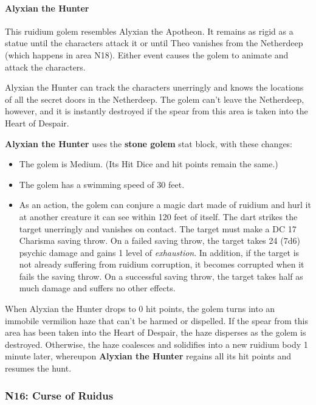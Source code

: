 \documentclass[a4paper, 11pt, bg=full, twocolumn, nooutline]{dndbook}
\begin{document}
\paragraph{Alyxian the Hunter}

This ruidium golem resembles Alyxian the Apotheon. It remains as rigid as a statue until the characters attack it or until Theo vanishes from the Netherdeep (which happens in area N18). Either event causes the golem to animate and attack the characters.

Alyxian the Hunter can track the characters unerringly and knows the locations of all the secret doors in the Netherdeep. The golem can't leave the Netherdeep, however, and it is instantly destroyed if the spear from this area is taken into the Heart of Despair.

\textbf{Alyxian the Hunter} uses the \textbf{stone golem} stat block, with these changes:

\begin{itemize}
\item The golem is Medium. (Its Hit Dice and hit points remain the same.)
\item The golem has a swimming speed of 30 feet.
\item As an action, the golem can conjure a magic dart made of ruidium and hurl it at another creature it can see within 120 feet of itself. The dart strikes the target unerringly and vanishes on contact. The target must make a DC 17 Charisma saving throw. On a failed saving throw, the target takes 24 (7d6) psychic damage and gains 1 level of \textit{exhaustion}. In addition, if the target is not already suffering from ruidium corruption, it becomes corrupted when it fails the saving throw. On a successful saving throw, the target takes half as much damage and suffers no other effects.
\end{itemize}

When Alyxian the Hunter drops to 0 hit points, the golem turns into an immobile vermilion haze that can't be harmed or dispelled. If the spear from this area has been taken into the Heart of Despair, the haze disperses as the golem is destroyed. Otherwise, the haze coalesces and solidifies into a new ruidium body 1 minute later, whereupon \textbf{Alyxian the Hunter} regains all its hit points and resumes the hunt.

\subsubsection{N16: Curse of Ruidus}
\end{document}
